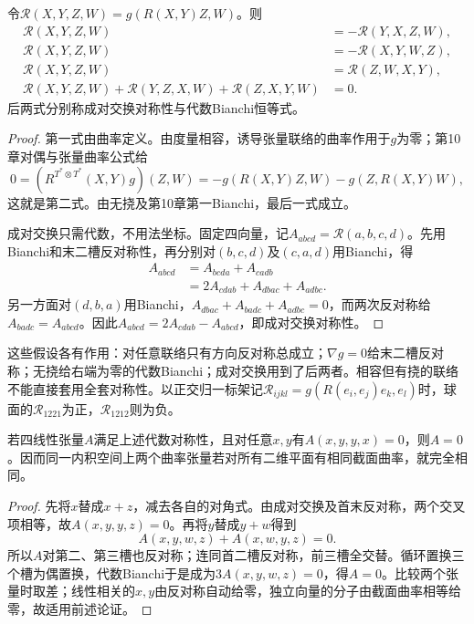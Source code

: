 \begin{theorem}\label{thm:metric-curvature-symmetries}
令$\mathcal R(X,Y,Z,W)=g(R(X,Y)Z,W)$。则
\begin{align*}
 \mathcal R(X,Y,Z,W)&=-\mathcal R(Y,X,Z,W),\\
 \mathcal R(X,Y,Z,W)&=-\mathcal R(X,Y,W,Z),\\
 \mathcal R(X,Y,Z,W)&=\mathcal R(Z,W,X,Y),\\
 \mathcal R(X,Y,Z,W)+\mathcal R(Y,Z,X,W)+\mathcal R(Z,X,Y,W)&=0.
\end{align*}
后两式分别称成对交换对称性与代数Bianchi恒等式。
\end{theorem}
\begin{proof}
第一式由曲率定义。由度量相容，诱导张量联络的曲率作用于$g$为零；第10章对偶与张量曲率公式给
\[
 0=(R^{T^*\otimes T^*}(X,Y)g)(Z,W)
 =-g(R(X,Y)Z,W)-g(Z,R(X,Y)W),
\]
这就是第二式。由无挠及第10章第一Bianchi，最后一式成立。

成对交换只需代数，不用法坐标。固定四向量，记$A_{abcd}=\mathcal R(a,b,c,d)$。先用Bianchi和末二槽反对称性，再分别对$(b,c,d)$及$(c,a,d)$用Bianchi，得
\begin{align*}
 A_{abcd}&=A_{bcda}+A_{cadb}\\
 &=2A_{cdab}+A_{dbac}+A_{adbc}.
\end{align*}
另一方面对$(d,b,a)$用Bianchi，$A_{dbac}+A_{badc}+A_{adbc}=0$，而两次反对称给$A_{badc}=A_{abcd}$。因此$A_{abcd}=2A_{cdab}-A_{abcd}$，即成对交换对称性。
\end{proof}

这些假设各有作用：对任意联络只有方向反对称总成立；$\nabla g=0$给末二槽反对称；无挠给右端为零的代数Bianchi；成对交换用到了后两者。相容但有挠的联络不能直接套用全套对称性。以正交归一标架记$\mathcal R_{ijkl}=g(R(e_i,e_j)e_k,e_l)$时，球面的$\mathcal R_{1221}$为正，$\mathcal R_{1212}$则为负。

\begin{proposition}[截面二次值确定整个曲率]\label{prop:curvature-polarization}
若四线性张量$A$满足上述代数对称性，且对任意$x,y$有$A(x,y,y,x)=0$，则$A=0$。因而同一内积空间上两个曲率张量若对所有二维平面有相同截面曲率，就完全相同。
\end{proposition}
\begin{proof}
先将$x$替成$x+z$，减去各自的对角式。由成对交换及首末反对称，两个交叉项相等，故$A(x,y,y,z)=0$。再将$y$替成$y+w$得到
\[
 A(x,y,w,z)+A(x,w,y,z)=0.
\]
所以$A$对第二、第三槽也反对称；连同首二槽反对称，前三槽全交替。循环置换三个槽为偶置换，代数Bianchi于是成为$3A(x,y,w,z)=0$，得$A=0$。比较两个张量时取差；线性相关的$x,y$由反对称自动给零，独立向量的分子由截面曲率相等给零，故适用前述论证。
\end{proof}

